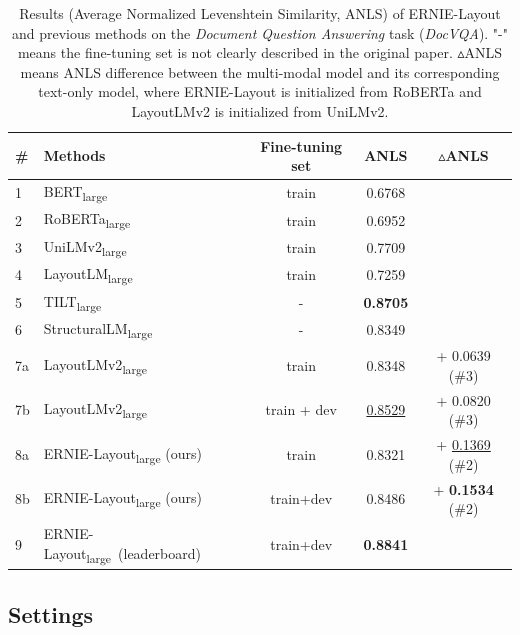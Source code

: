 \documentclass[11pt]{article}
\begin{document}
\begin{table}[t]
\centering
\small
\begin{tabular}{llccc}
\toprule
\# &\textbf{Methods}             &\textbf{Fine-tuning set}       &\textbf{ANLS} &\textbf{${\vartriangle}$ANLS} \\
\midrule
1 & BERT\textsubscript{large}~\cite{liu2019roberta}     &train  &0.6768 &\\
2 & RoBERTa\textsubscript{large}~\cite{liu2019roberta}  &train  &0.6952 & \\
3 & UniLMv2\textsubscript{large}~\cite{bao2020unilmv2} &train &0.7709 & \\
\midrule
4 & LayoutLM\textsubscript{large}~\cite{xu2020layoutlm}         &train &0.7259 & \\
5 & TILT\textsubscript{large}~\cite{powalski2021going}          &-     &\textbf{0.8705} & \\
6 & StructuralLM\textsubscript{large}~\cite{li2021structurallm} &-     &0.8349 & \\
\midrule
7a & LayoutLMv2\textsubscript{large}~\cite{xu2021layoutlmv2} & train & 0.8348 & + 0.0639 (\#3) \\
7b & LayoutLMv2\textsubscript{large}~\cite{xu2021layoutlmv2}             & train + dev & \underline{0.8529} & + 0.0820 (\#3) \\
\midrule
\midrule
8a & ERNIE-Layout\textsubscript{large} (ours)   &train     &0.8321 & + \underline{0.1369} (\#2)\\ 
8b & ERNIE-Layout\textsubscript{large} (ours)   &train+dev &0.8486 & + \textbf{0.1534} (\#2) \\ 
\midrule
9 & ERNIE-Layout\textsubscript{large}~(leaderboard) &train+dev &\textbf{0.8841} & \\
\bottomrule
\end{tabular}
\caption{Results (Average Normalized Levenshtein Similarity, ANLS) of ERNIE-Layout and previous methods on the \emph{Document Question Answering} task (\emph{DocVQA}). "-" means the fine-tuning set is not clearly described in the original paper. ${\vartriangle}$ANLS means ANLS difference between the multi-modal model and its corresponding text-only model, where ERNIE-Layout is initialized from RoBERTa and LayoutLMv2 is initialized from UniLMv2.} 
\label{tab:main_result_docvqa}
\end{table}


\subsection{Settings}
\end{document}
